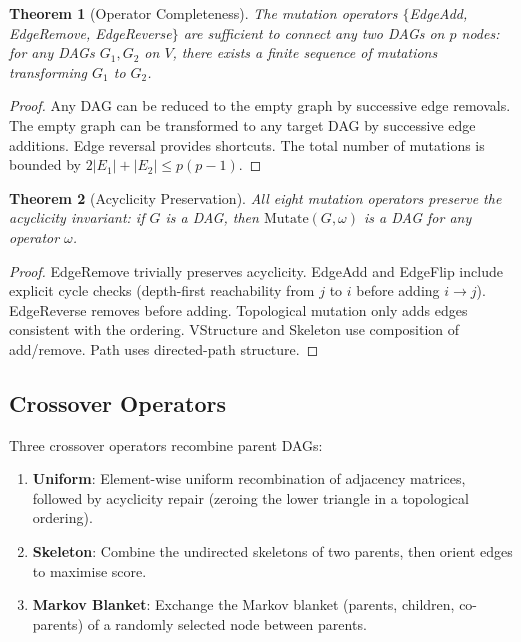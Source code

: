 \documentclass[11pt,a4paper]{article}
\newtheorem{theorem}{Theorem}
\begin{document}
\begin{theorem}[Operator Completeness]
\label{thm:completeness}
The mutation operators $\{$EdgeAdd, EdgeRemove, EdgeReverse$\}$ are sufficient to connect any two DAGs on $p$ nodes: for any DAGs $G_1, G_2$ on $V$, there exists a finite sequence of mutations transforming $G_1$ to $G_2$.
\end{theorem}

\begin{proof}
Any DAG can be reduced to the empty graph by successive edge removals. The empty graph can be transformed to any target DAG by successive edge additions. Edge reversal provides shortcuts. The total number of mutations is bounded by $2|E_1| + |E_2| \leq p(p-1)$.
\end{proof}

\begin{theorem}[Acyclicity Preservation]
\label{thm:acyclicity}
All eight mutation operators preserve the acyclicity invariant: if $G$ is a DAG, then $\text{Mutate}(G, \omega)$ is a DAG for any operator $\omega$.
\end{theorem}

\begin{proof}
EdgeRemove trivially preserves acyclicity. EdgeAdd and EdgeFlip include explicit cycle checks (depth-first reachability from $j$ to $i$ before adding $i \to j$). EdgeReverse removes before adding. Topological mutation only adds edges consistent with the ordering. VStructure and Skeleton use composition of add/remove. Path uses directed-path structure.
\end{proof}

\subsection{Crossover Operators}

Three crossover operators recombine parent DAGs:

\begin{enumerate}[leftmargin=*]
    \item \textbf{Uniform}: Element-wise uniform recombination of adjacency matrices, followed by acyclicity repair (zeroing the lower triangle in a topological ordering).
    \item \textbf{Skeleton}: Combine the undirected skeletons of two parents, then orient edges to maximise score.
    \item \textbf{Markov Blanket}: Exchange the Markov blanket (parents, children, co-parents) of a randomly selected node between parents.
\end{enumerate}
\end{document}

